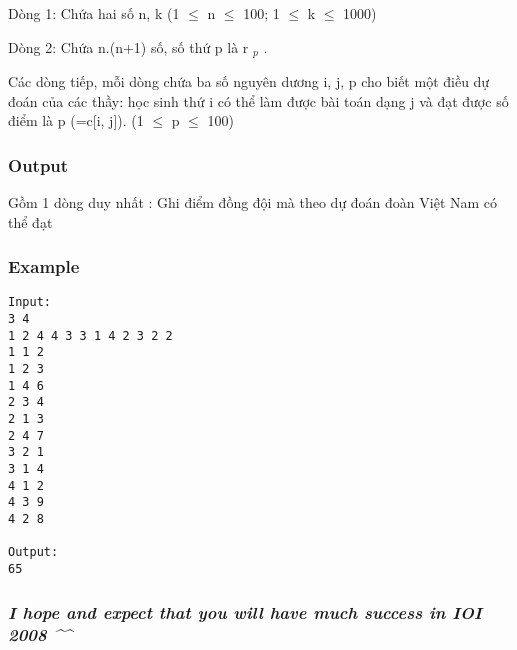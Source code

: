 Dòng 1: Chứa hai số n, k (1  $\le$  n  $\le$  100; 1  $\le$  k  $\le$  1000)

Dòng 2: Chứa n.(n+1) số, số thứ p là r $_ p $ .

Các dòng tiếp, mỗi dòng chứa ba số nguyên dương i, j, p cho biết một điều dự đoán của các thầy: học sinh thứ i có thể làm được bài toán dạng j và đạt được số điểm là p (=c[i, j]). (1  $\le$  p  $\le$  100)

\subsubsection{Output}

Gồm 1 dòng duy nhất : Ghi điểm đồng đội mà theo dự đoán đoàn Việt Nam có thể đạt

\subsubsection{Example}
\begin{verbatim}
Input:
3 4
1 2 4 4 3 3 1 4 2 3 2 2
1 1 2
1 2 3
1 4 6
2 3 4
2 1 3
2 4 7
3 2 1
3 1 4
4 1 2
4 3 9
4 2 8

Output:
65
\end{verbatim}

\subsubsection{\emph{I hope and expect that you will have much success in IOI 2008 \textasciicircum\textasciicircum }}
